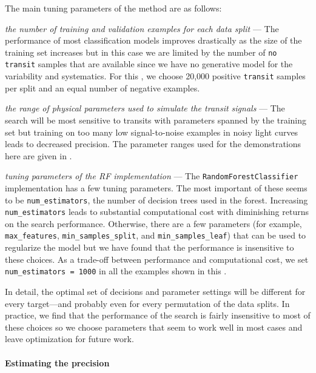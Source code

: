 The main tuning parameters of the method are as follows:
\begin{itemize}

{\item \emph{the number of training and validation examples for each data
split} --- The performance of most classification models improves drastically
as the size of the training set increases but in this case we are limited by
the number of \texttt{no transit} samples that are available since we have no
generative model for the variability and systematics.
For this \paper, we choose 20,000 positive \texttt{transit} samples per split
and an equal number of negative examples.}

{\item \emph{the range of physical parameters used to simulate the transit
signals} --- The search will be most sensitive to transits with parameters
spanned by the training set but training on too many low signal-to-noise
examples in noisy light curves leads to decreased precision.
The parameter ranges used for the demonstrations here are given in
.}

{\item \emph{tuning parameters of the RF implementation} --- The
\texttt{RandomForestClassifier} implementation has a few tuning parameters.
The most important of these seems to be \texttt{num\_estimators}, the number
of decision trees used in the forest.
Increasing \texttt{num\_estimators} leads to substantial computational cost
with diminishing returns on the search performance.
Otherwise, there are a few parameters (for example, \texttt{max\_features},
\texttt{min\_samples\_split}, and \texttt{min\_samples\_leaf}) that can be
used to regularize the model but we have found that the performance is
insensitive to these choices.
As a trade-off between performance and computational cost, we set
\texttt{num\_estimators = 1000} in all the examples shown in this \paper.}

\end{itemize}
In detail, the optimal set of decisions and parameter settings will be
different for every target---and probably even for every permutation of the
data splits.
In practice, we find that the performance of the search is fairly insensitive
to most of these choices so we choose parameters that seem to work well in
most cases and leave optimization for future work.


\paragraph{Estimating the precision}

